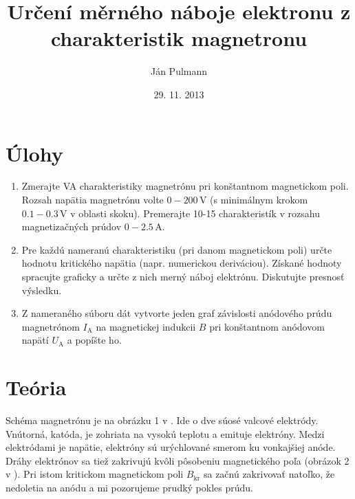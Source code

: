 \documentclass[a4paper, 10pt]{article}
\newcommand{\unit}[1]{\ensuremath{\, \mathrm{#1}}}
\newcommand{\di}[1]{\ensuremath{_\mathrm{#1}}}
\begin{document}
\title{Určení měrného náboje elektronu z charakteristik magnetronu}
\author{Ján Pulmann}
\date{29. 11. 2013}
\maketitle
\section*{Úlohy}
\begin{enumerate}

	\item Zmerajte VA charakteristiky magnetrónu pri konštantnom magnetickom poli. Rozsah napätia magnetrónu volte $0-200\unit V$ (s minimálnym krokom $0.1-0.3\unit V$ v oblasti skoku). Premerajte 10-15 charakteristík v rozsahu magnetizačných prúdov $0-2.5\unit A$.
    \item Pre každú nameranú charakteristiku (pri danom magnetickom poli) určte hodnotu kritického napätia (napr. numerickou deriváciou). Získané hodnoty spracujte graficky a určte z nich merný náboj elektrónu. Diskutujte presnosť výsledku.
    \item Z nameraného súboru dát vytvorte jeden graf závislosti anódového prúdu magnetrónom $I\di A$ na magnetickej indukcii $B$ pri konštantnom anódovom napätí $U\di A$ a popíšte ho.
 \end{enumerate}
 
\section*{Teória}
Schéma magnetrónu je na obrázku 1 v \cite{stud}. Ide o dve súosé valcové elektródy. Vnútorná, katóda, je zohriata na vysokú teplotu a emituje elektróny. Medzi elektródami je napätie, elektróny sú  urýchlované smerom ku vonkajšiej anóde. Dráhy elektrónov sa tiež zakrivujú kvôli pôsobeniu magnetického poľa (obrázok 2 v \cite{stud}). Pri istom kritickom magnetickom poli $B\di {kr}$ sa začnú zakrivovať natoľko, že nedoletia na anódu a mi pozorujeme prudký pokles prúdu. 
\end{document}
